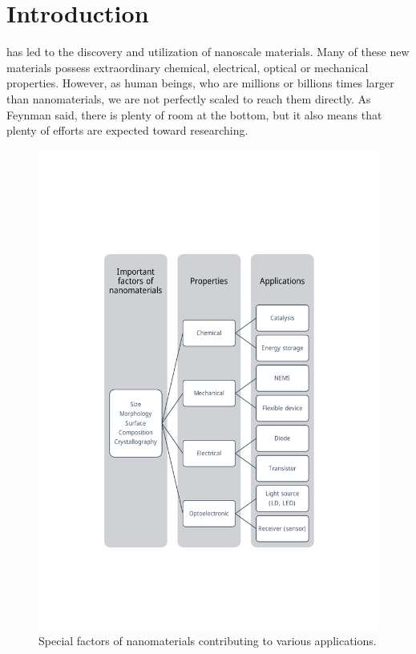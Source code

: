 

\chapter{Introduction}

 has led to the discovery and utilization of nanoscale materials. Many of these new materials possess extraordinary chemical, electrical, optical or mechanical properties. However, as human beings, who are millions or billions times larger than nanomaterials, we are not perfectly scaled to reach them directly. As Feynman said, there is plenty of room at the bottom, but it also means that plenty of efforts are expected toward researching. 

\begin{figure} 
\centering
\includegraphics[width=400pt]{figures/figure1_factors}
\caption[Factors and applications]{Special factors of nanomaterials contributing to various applications. 
\label{fig:1_factor}}
\end{figure}

